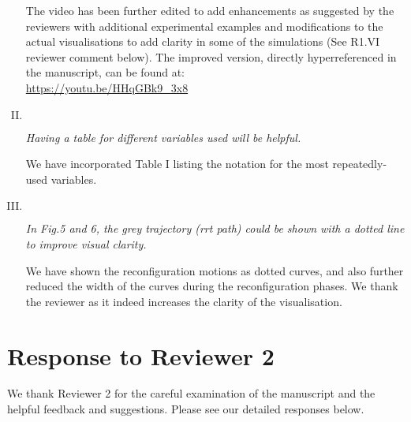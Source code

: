 \documentclass[11pt]{article}
\newenvironment{reviewer}
{\begin{mdframed}[roundcorner = 10pt,fontcolor=blue!70!black]\itshape}
{\end{mdframed}}
\begin{document}
\begin{enumerate}[I.]
The video has been further edited to add enhancements as suggested by the reviewers with additional experimental examples and modifications to the actual visualisations 
to add clarity in some of the simulations (See R1.VI reviewer comment below). The improved version, directly hyperreferenced in the manuscript, can be found at: \\
\url{https://youtu.be/HHqGBk9_3x8}
  
\newpage

  \item $ $
  \begin{reviewer}
  Having a table for different variables used will be helpful. 
  \end{reviewer}

\noindent
We have incorporated Table I listing the notation for the most repeatedly-used variables. 
  
  \item $ $
  \begin{reviewer}
    In Fig.5 and 6, the grey trajectory (rrt path) could be shown with a dotted line to improve visual clarity. 
  \end{reviewer}
\noindent
We have shown the reconfiguration motions as dotted curves, and also further reduced the width of the curves during the reconfiguration phases. 
We thank the reviewer as it indeed increases the clarity of the visualisation. 

  
\end{enumerate}

\clearpage

\section*{Response to Reviewer 2}
We thank Reviewer 2 for the careful examination of the manuscript and the helpful feedback and suggestions. Please see our detailed responses below.
\end{document}
